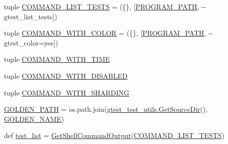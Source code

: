 \begin{DoxyCompactItemize}
\item 
tuple \mbox{\hyperlink{namespacegoogletest_1_1test_1_1googletest-output-test_a7f03431207f9588f4a02b7578186ef11}{C\+O\+M\+M\+A\+N\+D\+\_\+\+L\+I\+S\+T\+\_\+\+T\+E\+S\+TS}} = (\{\}, \mbox{[}\mbox{\hyperlink{namespacegoogletest_1_1test_1_1googletest-output-test_a467b9ea0b4c6224d494db6c2ca568d19}{P\+R\+O\+G\+R\+A\+M\+\_\+\+P\+A\+TH}}, \textquotesingle{}-\/-\/gtest\+\_\+list\+\_\+tests\textquotesingle{}\mbox{]})
\item 
tuple \mbox{\hyperlink{namespacegoogletest_1_1test_1_1googletest-output-test_ae8702b1a4f6d9b35ae7360c1b9099f98}{C\+O\+M\+M\+A\+N\+D\+\_\+\+W\+I\+T\+H\+\_\+\+C\+O\+L\+OR}} = (\{\}, \mbox{[}\mbox{\hyperlink{namespacegoogletest_1_1test_1_1googletest-output-test_a467b9ea0b4c6224d494db6c2ca568d19}{P\+R\+O\+G\+R\+A\+M\+\_\+\+P\+A\+TH}}, \textquotesingle{}-\/-\/gtest\+\_\+color=yes\textquotesingle{}\mbox{]})
\item 
tuple \mbox{\hyperlink{namespacegoogletest_1_1test_1_1googletest-output-test_a54e72934e08e180b2529b4940fa50e04}{C\+O\+M\+M\+A\+N\+D\+\_\+\+W\+I\+T\+H\+\_\+\+T\+I\+ME}}
\item 
tuple \mbox{\hyperlink{namespacegoogletest_1_1test_1_1googletest-output-test_a8a41b9a813e853542f000ad1c00a269a}{C\+O\+M\+M\+A\+N\+D\+\_\+\+W\+I\+T\+H\+\_\+\+D\+I\+S\+A\+B\+L\+ED}}
\item 
tuple \mbox{\hyperlink{namespacegoogletest_1_1test_1_1googletest-output-test_a852e37f51b0c4f3ce83c1d84eeaf5b1e}{C\+O\+M\+M\+A\+N\+D\+\_\+\+W\+I\+T\+H\+\_\+\+S\+H\+A\+R\+D\+I\+NG}}
\item 
\mbox{\hyperlink{namespacegoogletest_1_1test_1_1googletest-output-test_a8aa8d805d7dfff2638f6faeb8a25cd43}{G\+O\+L\+D\+E\+N\+\_\+\+P\+A\+TH}} = os.\+path.\+join(\mbox{\hyperlink{namespacegoogletest_1_1test_1_1gtest__test__utils_a9d2108c1a5f53b18368ebfc1970b73da}{gtest\+\_\+test\+\_\+utils.\+Get\+Source\+Dir}}(), \mbox{\hyperlink{namespacegoogletest_1_1test_1_1googletest-output-test_a48529ecdda438cb5f92cdab8f181b6ab}{G\+O\+L\+D\+E\+N\+\_\+\+N\+A\+ME}})
\item 
def \mbox{\hyperlink{namespacegoogletest_1_1test_1_1googletest-output-test_a444fd372288937a5fb698098ef061576}{test\+\_\+list}} = \mbox{\hyperlink{namespacegoogletest_1_1test_1_1googletest-output-test_aa5a7ea5b9a73e1538841493ed39fcca6}{Get\+Shell\+Command\+Output}}(\mbox{\hyperlink{namespacegoogletest_1_1test_1_1googletest-output-test_a7f03431207f9588f4a02b7578186ef11}{C\+O\+M\+M\+A\+N\+D\+\_\+\+L\+I\+S\+T\+\_\+\+T\+E\+S\+TS}})
\item 

\end{DoxyCompactItemize}
